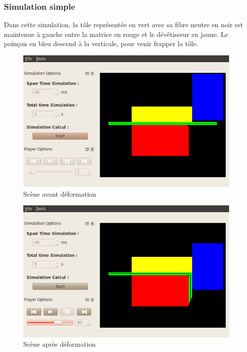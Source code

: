 \documentclass[a4paper, 11pt]{article}
\begin{document}
\subsubsection{Simulation simple}
Dans cette simulation, la tôle représentée en vert avec sa fibre neutre en noir est maintenue à gauche entre la matrice en rouge et le dévêtisseur en jaune.
Le poinçon en bleu descend à la verticale, pour venir frapper la tôle.
\begin{figure}[H]
    \begin{center}
        \includegraphics[width=.8\textwidth]{img/fenetreInitiale.png}
    \end{center}
    \caption{Scène avant déformation}
\end{figure}
\begin{figure}[H]
    \begin{center}
        \includegraphics[width=.8\textwidth]{img/fenetreInitiale2.png}
    \end{center}
    \caption{Scène après déformation}
\end{figure}
\end{document}
